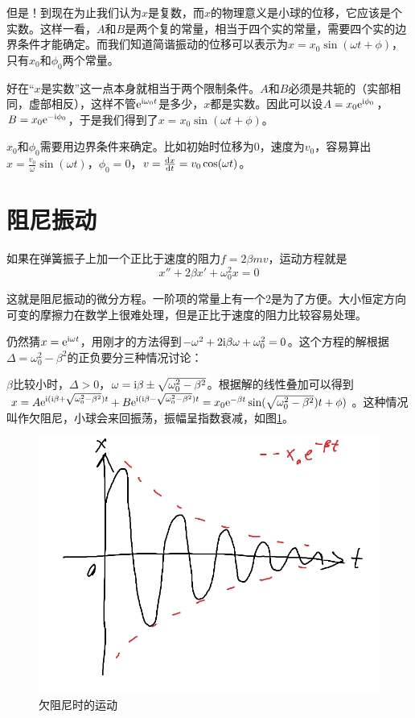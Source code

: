 但是！到现在为止我们认为$x$是复数，而$x$的物理意义是小球的位移，它应该是个实数。这样一看，$A$和$B$是两个复的常量，相当于四个实的常量，需要四个实的边界条件才能确定。而我们知道简谐振动的位移可以表示为$x=x_0 \sin(\omega t+\phi)$，只有$x_0$和$\phi_0$两个常量。

好在“$x$是实数”这一点本身就相当于两个限制条件。$A$和$B$必须是共轭的（实部相同，虚部相反），这样不管$\mathrm{e}^{\mathrm{i} \omega_0 t}$是多少，$x$都是实数。因此可以设$A=x_0 \mathrm{e}^{\mathrm{i} \phi_0}$，$B=x_0 \mathrm{e}^{-\mathrm{i} \phi_0}$，于是我们得到了$x=x_0 \sin(\omega t+\phi)$。

$x_0$和$\phi_0$需要用边界条件来确定。比如初始时位移为$0$，速度为$v_0$，容易算出$x=\frac{v_0}{\omega} \sin(\omega t)$，$\phi_0=0$，$v=\frac{\mathop{}\!\mathrm{d} x}{\mathop{}\!\mathrm{d} t}=v_0 \cos(\omega t)$。
\section{阻尼振动}
如果在弹簧振子上加一个正比于速度的阻力$f=2 \beta m v$，运动方程就是
\begin{equation*}
x''+2 \beta x'+\omega_0^2 x=0
\end{equation*}

这就是阻尼振动的微分方程。一阶项的常量上有一个2是为了方便。大小恒定方向可变的摩擦力在数学上很难处理，但是正比于速度的阻力比较容易处理。

仍然猜$x=\mathrm{e}^{\mathrm{i} \omega t}$，用刚才的方法得到$-\omega^2+2 \mathrm{i} \beta \omega+\omega_0^2=0$。这个方程的解根据$\Delta=\omega_0^2-\beta^2$的正负要分三种情况讨论：

$\beta$比较小时，$\Delta>0$，$\omega=\mathrm{i} \beta \pm \sqrt{\omega_0^2-\beta^2}$。根据解的线性叠加可以得到$x=A \mathrm{e}^{\mathrm{i} (\mathrm{i} \beta+\sqrt{\omega_0^2-\beta^2}) t}+B \mathrm{e}^{\mathrm{i} (\mathrm{i} \beta-\sqrt{\omega_0^2-\beta^2}) t}=x_0 \mathrm{e}^{-\beta t} \sin(\sqrt{\omega_0^2-\beta^2}) t+\phi)$。这种情况叫作欠阻尼，小球会来回振荡，振幅呈指数衰减，如图\ref{fig-under-dump}。
\begin{figure}[htb]
\centering
\includegraphics[scale=0.5]{fig/under-dump.png}
\caption{欠阻尼时的运动}
\label{fig-under-dump}
\end{figure}

